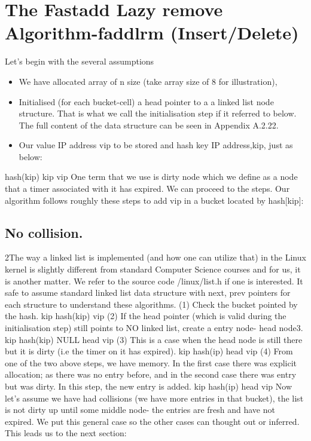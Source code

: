 \section{The Fastadd Lazy remove Algorithm-faddlrm (Insert/Delete)}
Let's begin with the several assumptions
\begin{itemize}
\item We have allocated array of n size (take array size of 8 for illustration),
\item Initialised (for each bucket-cell) a head pointer to a a linked list node
structure. That is what we call the initialisation step if it referred to
below. The full content of the data structure can be seen in Appendix
A.2.22.
\item Our value IP address vip to be stored and hash key IP address,kip, just
as below:
\end{itemize}
hash(kip)
kip
vip
One term that we use is dirty node which we define as a node that a timer
associated with it has expired. We can proceed to the steps.
Our algorithm follows roughly these steps to add vip in a bucket located by
hash[kip]:
\subsection{No collision.}
2The way a linked list is implemented (and how one can utilize that) in the Linux kernel is slightly
different from standard Computer Science courses and for us, it is another matter. We refer to the
source code /linux/list.h if one is interested. It safe to assume standard linked list data structure
with next, prev pointers for each structure to understand these algorithms.
(1) Check the bucket pointed by the hash.
kip
hash(kip)
vip
(2) If the head pointer (which is valid during the initialisation step) still points
to NO linked list, create a entry node- head node3.
kip
hash(kip)
NULL
head
vip
(3) This is a case when the head node is still there but it is dirty (i.e the timer
on it has expired).
kip
hash(ip)
head
vip
(4) From one of the two above steps, we have memory. In the first case there
was explicit allocation; as there was no entry before, and in the second
case there was entry but was dirty. In this step, the new entry is added.
kip
hash(ip)
head
vip
Now let's assume we have had collisions (we have more entries in that bucket),
the list is not dirty up until some middle node- the entries are fresh and have not
expired. We put this general case so the other cases can thought out or inferred.
This leads us to the next section:
